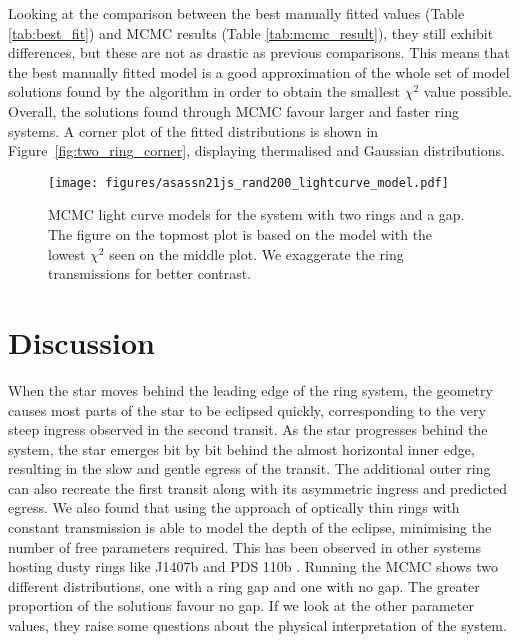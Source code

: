 \documentclass[letter]{aa} %
\begin{document}
%
Looking at the comparison between the best manually fitted values (Table \ref{tab:best_fit}) and MCMC results (Table \ref{tab:mcmc_result}), they still exhibit differences, but these are not as drastic as previous comparisons.
%
This means that the best manually fitted model is a good approximation of the whole set of model solutions found by the algorithm in order to obtain the smallest $\chi^2$ value possible.
%
Overall, the solutions found through MCMC favour larger and faster ring systems.
%
A corner plot of the fitted distributions is shown in Figure~\ref{fig:two_ring_corner}, displaying thermalised and Gaussian distributions.

\begin{figure*}[tp]
    \centering
    \texttt{[image: figures/asassn21js\_rand200\_lightcurve\_model.pdf]}
    \caption{MCMC light curve models for the system with two rings and a gap.
   The figure on the topmost plot is based on the model with the lowest $\chi^2$ seen on the middle plot.
    We exaggerate the ring transmissions for better contrast.} 
    \label{fig:plot_lc_2ring_gap}
\end{figure*}

\section{Discussion}
\label{sec:Discussion}

When the star moves behind the leading edge of the ring system, the geometry causes most parts of the star to be eclipsed quickly, corresponding to the very steep ingress observed in the second transit. 
%
As the star progresses behind the system, the star emerges bit by bit behind the almost horizontal inner edge, resulting in the slow and gentle egress of the transit.
%
The additional outer ring can also recreate the first transit along with its asymmetric ingress and predicted egress. 
%
We also found that using the approach of optically thin rings with constant transmission is able to model the depth of the eclipse, minimising the number of free parameters required.
%
This has been observed in other systems hosting dusty rings like J1407b \citep{Mamajek12, Kenworthy_2015} and PDS 110b \citep{Osborn17}.
%
Running the MCMC shows two different distributions, one with a ring gap and one with no gap.
%
The greater proportion of the solutions favour no gap.
%
If we look at the other parameter values, they raise some questions about the physical interpretation of the system. 
\end{document}
